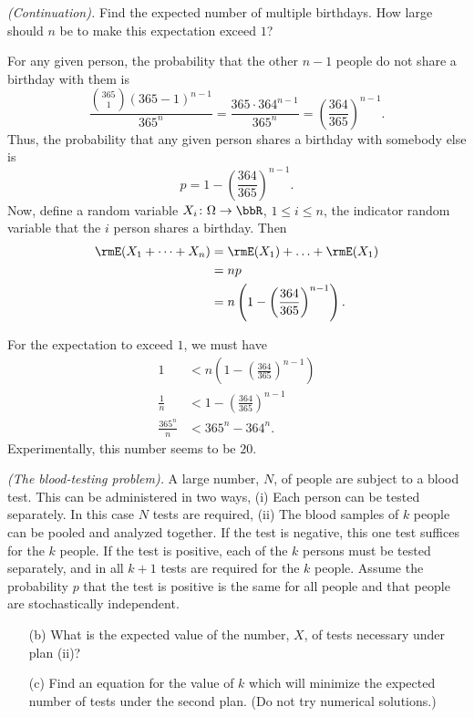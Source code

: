 \begin{problem}[Handout 6, \# 11]
  \emph{(Continuation).} Find the expected number of multiple
  birthdays. How large should \(n\) be to make this expectation exceed
  \(1\)?
\end{problem}
\begin{solution}
  For any given person, the probability that the other \(n-1\) people do
  not share a birthday with them is
  \[
    \frac{\binom{365}{1}(365-1)^{n-1}}{365^n}=\frac{365\cdot 364^{n-1}}{365^n}
    =\left(\frac{364}{365}\right)^{n-1}.
  \]
  Thus, the probability that any given person shares a birthday with
  somebody else is
  \[
    p=1-\left(\frac{364}{365}\right)^{n-1}.
  \]
  Now, define a random variable \(X_i\colon\Omega\to\bbR\),
  \(1\leq i\leq n\), the indicator random variable that the
  \(i\) person shares a birthday. Then
  \begin{align*}
    \rmE(X_1+\dotsb+X_n)
    &=\rmE(X_1)+\dotsc+\rmE(X_1)\\
    &=n p\\
    &=n\left(1-\left(\frac{364}{365}\right)^{n-1}\right).
  \end{align*}

  For the expectation to exceed \(1\), we must have
  \begin{align*}
    1
    &<n\left(1-\left(\frac{364}{365}\right)^{n-1}\right)\\
    \frac{1}{n}&<1-\left(\frac{364}{365}\right)^{n-1}\\
    \frac{365^n}{n}&<365^n-364^n.
  \end{align*}
  Experimentally, this number seems to be \(20\).
\end{solution}
\newpage

\begin{problem}[Handout 6, \# 12]
  \emph{(The blood-testing problem).} A large number, \(N\), of people are
  subject to a blood test. This can be administered in two ways, (i) Each
  person can be tested separately. In this case \(N\) tests are required,
  (ii) The blood samples of \(k\) people can be pooled and analyzed
  together. If the test is negative, this one test suffices for the \(k\)
  people. If the test is positive, each of the \(k\) persons must be tested
  separately, and in all \(k+1\) tests are required for the \(k\)
  people. Assume the probability \(p\) that the test is positive is the
  same for all people and that people are stochastically independent.
  \begin{itemize}[noitemsep]
  \item[(b)] What is the expected value of the number, \(X\), of tests
    necessary under plan (ii)?
  \item[(c)] Find an equation for the value of \(k\) which will minimize
    the expected number of tests under the second plan. (Do not try
    numerical solutions.)
  \end{itemize}
  \end{problem}
\begin{solution}

\end{solution}
\newpage

